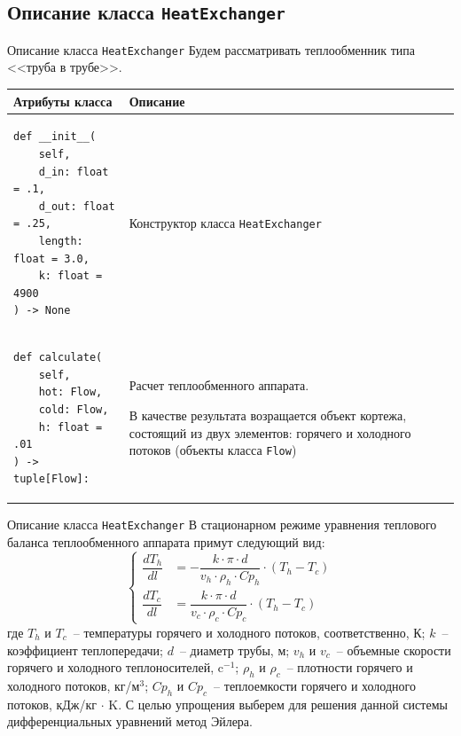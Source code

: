 \documentclass[aspectratio=169, mathserif]{beamer}%
\begin{document}
\subsection{Описание класса \texttt{HeatExchanger}}
\begin{frame}[fragile]{Описание класса \texttt{HeatExchanger}}
\scriptsize
Будем рассматривать теплообменник типа <<труба в трубе>>.
\vfill
\begin{table}[h!]
	\centering
	\renewcommand{\arraystretch}{1.2}
	\begin{tabular}{|p{.49\linewidth}|p{.49\linewidth}|}
		\hline
		\textbf{Атрибуты класса} & \textbf{Описание}  \\
		\hline
\begin{minipage}{\linewidth}
\vfill
\begin{verbatim}
def __init__(
    self,
    d_in: float = .1,
    d_out: float = .25,
    length: float = 3.0,
    k: float = 4900
) -> None
\end{verbatim}
\vfill
\end{minipage}
		& Конструктор класса \texttt{HeatExchanger}\\
		\hline
\begin{minipage}{\linewidth}
\vfill
\begin{verbatim}
def calculate(
    self,
    hot: Flow,
    cold: Flow,
    h: float = .01
) -> tuple[Flow]:
\end{verbatim}
\vfill
\end{minipage}
		& Расчет теплообменного аппарата.

		 В качестве результата возращается объект кортежа, состоящий из двух элементов: горячего и холодного потоков (объекты класса \texttt{Flow})\\
		\hline
	\end{tabular}
\end{table}
\vfill
\end{frame}

\begin{frame}[fragile]{Описание класса \texttt{HeatExchanger}}
\scriptsize
В стационарном режиме уравнения теплового баланса теплообменного аппарата примут следующий вид:
\vfill
\begin{equation*}
\left\{
\begin{aligned}
	\dfrac{dT_h}{dl} &= -\dfrac{k \cdot \pi \cdot d}{v_h \cdot \rho _h \cdot Cp_h} \cdot \left(T_h - T_c\right) \\
	\dfrac{dT_c}{dl} &= \dfrac{k \cdot \pi \cdot d}{v_c \cdot \rho _c \cdot Cp_c} \cdot \left(T_h - T_c\right)
\end{aligned}
\right.
\end{equation*}
\vfill
где $T_h$ и $T_c$~-- температуры горячего и холодного потоков, соответственно, К; $k$~-- коэффициент теплопередачи; $d$~-- диаметр трубы, м; $v_h$ и $v_c$~-- объемные скорости горячего и холодного теплоносителей, c$^{-1}$; $\rho _h$ и $\rho _c$~-- плотности горячего и холодного потоков, кг/м$^3$; $Cp _h$ и $Cp _c$~-- теплоемкости горячего и холодного потоков, кДж/кг $\cdot$ K.
\vfill
С целью упрощения выберем для решения данной системы дифференциальных уравнений метод Эйлера.
\vfill
\end{frame}
\end{document}
